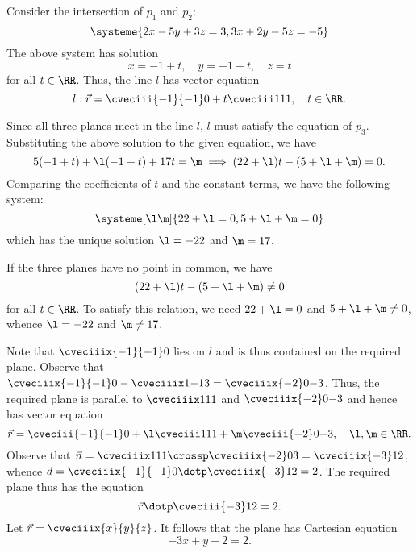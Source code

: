 \begin{solution}
    \begin{ppart}
        Consider the intersection of $p_1$ and $p_2$: \[
        \systeme{
            2x-5y+3z= 3,
            3x+2y-5z=-5
        }\] The above system has solution \[x = -1 + t, \quad y = -1 + t, \quad z = t\] for all $t \in \RR$. Thus, the line $l$ has vector equation \[l : \vec r = \cveciii{-1}{-1}0 + t \cveciii111, \quad t \in \RR.\]
    \end{ppart}
    \begin{ppart}
        Since all three planes meet in the line $l$, $l$ must satisfy the equation of $p_3$. Substituting the above solution to the given equation, we have \[5(-1 + t) + \l(-1 + t) + 17t = \m \implies (22+\l)t - (5+\l+\m) = 0.\] Comparing the coefficients of $t$ and the constant terms, we have the following system: \[
            \systeme[\l\m]{
                22 + \l = 0,
                5 + \l + \m = 0
        }\] which has the unique solution $\l = -22$ and $\m = 17$.
    \end{ppart}
    \begin{ppart}
        If the three planes have no point in common, we have \[(22+\l)t - (5+\l+\m) \neq 0\] for all $t \in \RR$. To satisfy this relation, we need $22 + \l = 0$ and $5 + \l + \m \neq 0$, whence $\l = -22$ and $\m \neq 17$.
    \end{ppart}
    \begin{ppart}
        Note that $\cveciiix{-1}{-1}0$ lies on $l$ and is thus contained on the required plane. Observe that $\cveciiix{-1}{-1}0 - \cveciiix1{-1}3 = \cveciiix{-2}0{-3}$. Thus, the required plane is parallel to $\cveciiix111$ and $\cveciiix{-2}0{-3}$ and hence has vector equation \[\vec r = \cveciii{-1}{-1}0 + \l\cveciii111 + \m\cveciii{-2}0{-3}, \quad \l, \m \in \RR.\] Observe that $\vec n = \cveciiix111 \crossp \cveciiix{-2}03 = \cveciiix{-3}12$, whence $d = \cveciiix{-1}{-1}0 \dotp \cveciiix{-3}12 = 2$. The required plane thus has the equation \[\vec r \dotp \cveciii{-3}12 = 2.\] Let $\vec r = \cveciiix{x}{y}{z}$. It follows that the plane has Cartesian equation \[-3x + y + 2 = 2.\]
    \end{ppart}
\end{solution}

